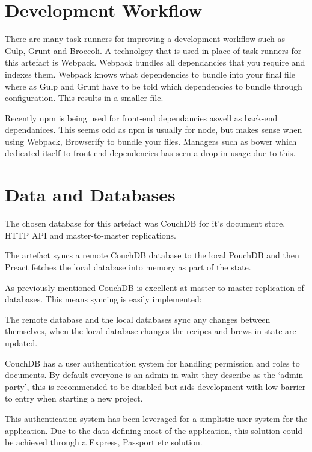 \section{Development Workflow}

There are many task runners for improving a development workflow such as Gulp, Grunt and Broccoli. A technolgoy that is used in place of task runners for this artefact is Webpack. Webpack bundles all dependancies that you require and indexes them. Webpack knows what dependencies to bundle into your final file where as Gulp and Grunt have to be told which dependencies to bundle through configuration. This results in a smaller file. \cite{webpack}

Recently npm is being used for front-end dependancies aswell as back-end dependanices. This seems odd as npm is usually for node, but makes sense when using Webpack, Browserify to bundle your files. Managers such as bower which dedicated itself to front-end dependencies has seen a drop in usage due to this. \cite{browserify} \cite{bower}


\section{Data and Databases}

The chosen database for this artefact was CouchDB for it's document store, HTTP API and master-to-master replications. \cite{couchdb}

The artefact syncs a remote CouchDB database to the local PouchDB and then Preact fetches the local database into memory as part of the state.

As previously mentioned CouchDB is excellent at master-to-master replication of databases. This means syncing is easily implemented:


The remote database and the local databases sync any changes between themselves, when the local database changes the recipes and brews in state are updated.

CouchDB has a user authentication system for handling permission and roles to documents. By default everyone is an admin in waht they describe as the `admin party', this is recommended to be disabled but aids development with low barrier to entry when starting a new project.

This authentication system has been leveraged for a simplistic user system for the application. Due to the data defining most of the application, this solution could be achieved through a Express, Passport etc solution.

